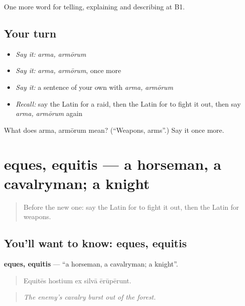 \begin{grammarlens}[title={What you've built}]
One more word for telling, explaining and describing at B1.
\end{grammarlens}

\subsection*{Your turn}
\begin{itemize}
\raggedright
  \item \emph{Say it:} \emph{arma, armōrum}
  \item \emph{Say it:} \emph{arma, armōrum}, once more
  \item \emph{Say it:} a sentence of your own with \emph{arma, armōrum}
  \item \emph{Recall:} say the Latin for a raid, then the Latin for to fight it out, then say \emph{arma, armōrum} again
\end{itemize}

\begin{tcolorbox}[breakable,colback=teal!4,colframe=teal!35!black,title={Before you move on}]
What does arma, armōrum mean? (\textquotedblleft{}Weapons, arms\textquotedblright{}.) Say it once more.
\end{tcolorbox}
\section[eques, equitis]{eques, equitis — a horseman, a cavalryman; a knight}

\label{lesson:LA-C340-eques}



\begin{quote}
Before the new one: say the Latin for to fight it out, then the Latin for weapons.
\end{quote}

\subsection*{You'll want to know: eques, equitis}
\textbf{eques, equitis} — \textquotedblleft{}a horseman, a cavalryman; a knight\textquotedblright{}.

\begin{quote}
Equitēs hostium ex silvā ērūpērunt.
\end{quote}

\begin{quote}
\emph{The enemy's cavalry burst out of the forest.}
\end{quote}

